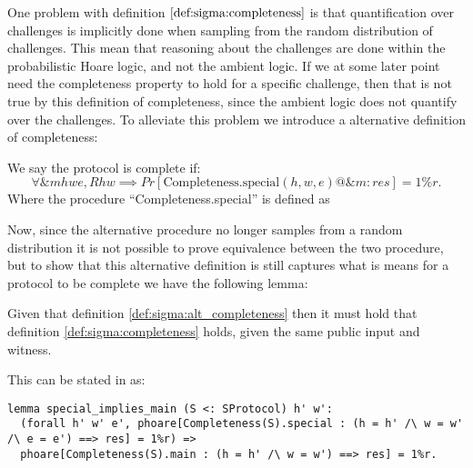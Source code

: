 One problem with definition $\ref{def:sigma:completeness}$ is that
quantification over challenges is implicitly done when sampling from the random
distribution of challenges. This mean that reasoning about the challenges are
done within the probabilistic Hoare logic, and not the ambient logic. If we at
some later point need the completeness property to hold for a specific
challenge, then that is not true by this definition of completeness, since
the ambient logic does not quantify over the challenges. To alleviate this
problem we introduce a alternative definition of completeness:

\begin{definition}
\label{def:sigma:alt_completeness}
  We say the protocol is complete if:
  \begin{equation}
    \label{eq:sigma_completeness}
    \forall \&m h w e, R h w \implies Pr[\text{Completeness.special}(h,w,e) @ \&m : res] = 1\%r.
  \end{equation}
  Where the procedure ``Completeness.special'' is defined as
  
\end{definition}

Now, since the alternative procedure no longer samples from a random
distribution it is not possible to prove equivalence between the two procedure,
but to show that this alternative definition is still captures what is means for
a protocol to be complete we have the following lemma:

\begin{lemma}
Given that definition \ref{def:sigma:alt_completeness} then it must hold that
definition \ref{def:sigma:completeness} holds, given the same public input and witness.

This can be stated in \easycrypt as:
\begin{lstlisting}
lemma special_implies_main (S <: SProtocol) h' w':
  (forall h' w' e', phoare[Completeness(S).special : (h = h' /\ w = w' /\ e = e') ==> res] = 1%r) =>
  phoare[Completeness(S).main : (h = h' /\ w = w') ==> res] = 1%r.
\end{lstlisting}
\end{lemma}

